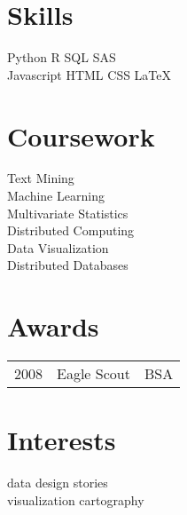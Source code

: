 \documentclass[]{deedy-resume-openfont}
\begin{document}
\begin{minipage}[t]{0.33\textwidth}

\section{Skills}
Python \textbullet{} R \textbullet{} SQL \textbullet{} SAS \textbullet{} \\
Javascript \textbullet{} HTML \textbullet{} CSS \textbullet{} \LaTeX\ \\ 
\sectionsep


\section{Coursework}
Text Mining \\
Machine Learning \\
Multivariate Statistics \\
Distributed Computing \\
Data Visualization \\
Distributed Databases \\
\sectionsep


\section{Awards} 
\begin{tabular}{rll}
	2008 & Eagle Scout & BSA \\
\end{tabular}
\sectionsep


\section{Interests}
data \textbullet{} design \textbullet{} stories \textbullet{} \\
visualization \textbullet{} cartography 

%
%

\end{minipage} 
\hfill
\end{document}
